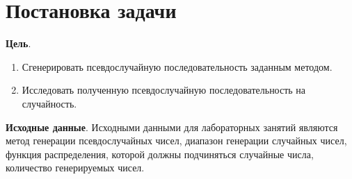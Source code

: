 \documentclass[bachelor, och, labwork]{SCWorks}
\begin{document}



\tableofcontents

\section{Постановка задачи}
\textbf{Цель}.
\begin{enumerate}
  \item Сгенерировать псевдослучайную последовательность заданным методом. 
  \item Исследовать полученную псевдослучайную последовательность на случайность.
\end{enumerate}

\textbf{Исходные данные}. Исходными данными для лабораторных занятий являются метод генерации псевдослучайных чисел, 
диапазон генерации случайных чисел, функция распределения, которой должны подчиняться случайные 
числа, количество генерируемых чисел. 
\end{document}
